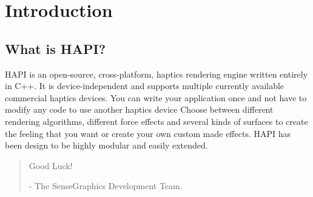 
\chapter{Introduction}

\section{What is HAPI?}
HAPI is an open-source, cross-platform, haptics rendering engine written entirely in C++. It is device-independent and supports multiple currently available commercial haptics devices. You can write your application once and not have to modify any code to use another haptics device
 Choose between different rendering algorithms, different force effects
 and several kinds of surfaces to create the feeling that you want or create your own custom made effects. HAPI has been design to be highly modular and easily extended.

\begin{quotation}
Good Luck!

- The SenseGraphics Development Team.
\end{quotation}




 


